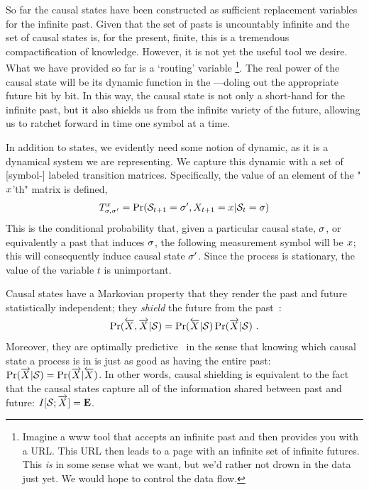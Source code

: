 So far the causal states have been constructed as sufficient replacement variables for the infinite past. Given that the set of pasts is uncountably infinite and the set of causal states is, for the present, finite, this is a tremendous compactification of knowledge. However, it is not yet the useful tool we desire. What we have provided so far is a `routing' variable \footnote{Imagine a www tool that accepts an infinite past and then provides you with a URL. This URL then leads to a page with an infinite set of infinite futures. This \emph{is} in some sense what we want, but we'd rather not drown in the data just yet. We would hope to control the data flow.}. The real power of the causal state will be its dynamic function in the \eM---doling out the appropriate future bit by bit. In this way, the causal state is not only a short-hand for the infinite past, but it also shields us from the infinite variety of the future, allowing us to ratchet forward in time one symbol at a time.

In addition to states, we evidently need some notion of dynamic, as it is a dynamical system we are representing. We capture this dynamic with a set of [symbol-] labeled transition matrices. Specifically, the value of an element of the "${x}$'th" matrix is defined,
\begin{align*}
T_{\sigma, {\sigma^{\prime}}}^{{x}} = \Pr(\mathcal{S}_{t+1} = {\sigma^{\prime}}, {X}_{t+1} = {x} | \mathcal{S}_t = \sigma)
\end{align*}
This is the conditional probability that, given a particular causal state, $\sigma$, or equivalently a past that induces $\sigma$, the following measurement symbol will be ${x}$; this will consequently induce causal state ${\sigma^{\prime}}$. Since the process is stationary, the value of the variable $t$ is unimportant.

Causal states have a Markovian property that they render the past and future
statistically independent; they \emph{shield} the future from the past~\cite{Crut98d}:
\begin{equation}
\Pr(\smash{\overleftarrow {{X}}},\smash{\overrightarrow{{X}}}|\mathcal{S})
  = \Pr(\smash{\overleftarrow {{X}}}|\mathcal{S}) \Pr(\smash{\overrightarrow{{X}}}|\mathcal{S}) ~.
\label{shield}
\end{equation}
Moreover, they are optimally predictive~\cite{Crut88a} in the sense that
knowing which causal state a process is in is just as good as having the
entire past: $\Pr(\smash{\overrightarrow{{X}}}|\mathcal{S}) = \Pr(\smash{\overrightarrow{{X}}}|\smash{\overleftarrow {{X}}})$. In other
words, causal shielding is equivalent to the fact~\cite{Crut98d} that the
causal states capture all of the information shared between past and future:
$I[\mathcal{S};\smash{\overrightarrow{{X}}}] = {\bf E}$.

